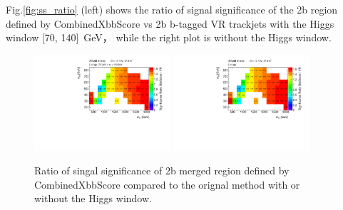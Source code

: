 \par   Fig.\ref{fig:ss_ratio} (left) shows the ratio of signal significance of the 2b region defined by CombinedXbbScore vs 2b b-tagged VR trackjets with the Higgs window [70, 140]~GeV，
while the right plot is without the Higgs window.
\begin{figure}[h]
    \centering
    \includegraphics[width=0.45\textwidth]{appendices/fig/2b-tags_XbbScoreoverVR_HiggsWindow.pdf}
    \includegraphics[width=0.45\textwidth]{appendices/fig/2b-tags_XbbScoreoverVR.pdf}
    \caption{Ratio of singal significance of 2b merged region defined by CombinedXbbScore compared to the orignal method with or without the Higgs window.}

    \label{fig:mj_after}
\end{figure}


